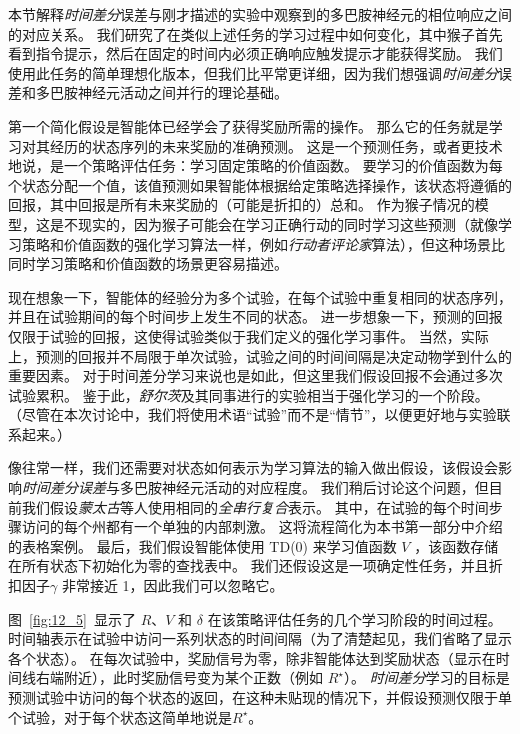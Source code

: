 本节解释\textit{时间差分}误差与刚才描述的实验中观察到的多巴胺神经元的相位响应之间的对应关系。
我们研究了在类似上述任务的学习过程中如何变化，其中猴子首先看到指令提示，然后在固定的时间内必须正确响应触发提示才能获得奖励。
我们使用此任务的简单理想化版本，但我们比平常更详细，因为我们想强调\textit{时间差分}误差和多巴胺神经元活动之间并行的理论基础。


第一个简化假设是智能体已经学会了获得奖励所需的操作。
那么它的任务就是学习对其经历的状态序列的未来奖励的准确预测。
这是一个预测任务，或者更技术地说，是一个策略评估任务：学习固定策略的价值函数。
要学习的价值函数为每个状态分配一个值，该值预测如果智能体根据给定策略选择操作，该状态将遵循的回报，其中回报是所有未来奖励的（可能是折扣的）总和。
作为猴子情况的模型，这是不现实的，因为猴子可能会在学习正确行动的同时学习这些预测（就像学习策略和价值函数的强化学习算法一样，例如\textit{行动者}\textit{评论家}算法），但这种场景比同时学习策略和价值函数的场景更容易描述。


现在想象一下，智能体的经验分为多个试验，在每个试验中重复相同的状态序列，并且在试验期间的每个时间步上发生不同的状态。
进一步想象一下，预测的回报仅限于试验的回报，这使得试验类似于我们定义的强化学习事件。
当然，实际上，预测的回报并不局限于单次试验，试验之间的时间间隔是决定动物学到什么的重要因素。
对于时间差分学习来说也是如此，但这里我们假设回报不会通过多次试验累积。
鉴于此，\textit{舒尔茨}及其同事进行的实验相当于强化学习的一个阶段。
（尽管在本次讨论中，我们将使用术语“试验”而不是“情节”，以便更好地与实验联系起来。）


像往常一样，我们还需要对状态如何表示为学习算法的输入做出假设，该假设会影响\textit{时间差分误差}与多巴胺神经元活动的对应程度。
我们稍后讨论这个问题，但目前我们假设\textit{蒙太古}等人使用相同的\textit{全串行复合}表示\cite{montague1996framework}。
其中，在试验的每个时间步骤访问的每个州都有一个单独的内部刺激。
这将流程简化为本书第一部分中介绍的表格案例。
最后，我们假设智能体使用 TD(0) 来学习值函数 $V$ ，该函数存储在所有状态下初始化为零的查找表中。
我们还假设这是一项确定性任务，并且折扣因子$\gamma$ 非常接近 1，因此我们可以忽略它。


图~\ref{fig:12_5}~显示了 $R$、$V$ 和 $\delta$ 在该策略评估任务的几个学习阶段的时间过程。 
时间轴表示在试验中访问一系列状态的时间间隔（为了清楚起见，我们省略了显示各个状态）。
在每次试验中，奖励信号为零，除非智能体达到奖励状态（显示在时间线右端附近），此时奖励信号变为某个正数（例如 $R^{\star}$）。
\textit{时间差分}学习的目标是预测试验中访问的每个状态的返回，在这种未贴现的情况下，并假设预测仅限于单个试验，对于每个状态这简单地说是$R^{\star}$。


